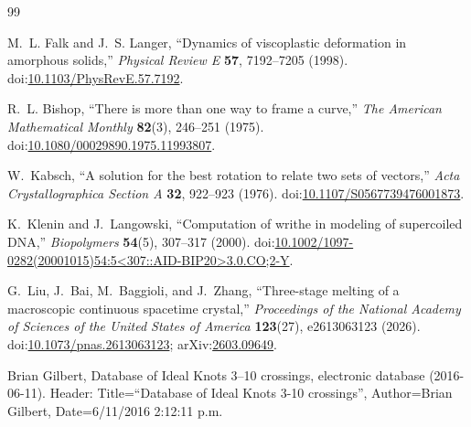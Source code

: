\begin{thebibliography}{99}

M.~L. Falk and J.~S. Langer,
``Dynamics of viscoplastic deformation in amorphous solids,''
\textit{Physical Review E} \textbf{57}, 7192--7205 (1998).
doi:\href{https://doi.org/10.1103/PhysRevE.57.7192}{10.1103/PhysRevE.57.7192}.

R.~L. Bishop,
``There is more than one way to frame a curve,''
\textit{The American Mathematical Monthly} \textbf{82}(3), 246--251 (1975).
doi:\href{https://doi.org/10.1080/00029890.1975.11993807}{10.1080/00029890.1975.11993807}.

W.~Kabsch,
``A solution for the best rotation to relate two sets of vectors,''
\textit{Acta Crystallographica Section A} \textbf{32}, 922--923 (1976).
doi:\href{https://doi.org/10.1107/S0567739476001873}{10.1107/S0567739476001873}.

K.~Klenin and J.~Langowski,
``Computation of writhe in modeling of supercoiled DNA,''
\textit{Biopolymers} \textbf{54}(5), 307--317 (2000).
doi:\href{https://doi.org/10.1002/1097-0282(20001015)54:5<307::AID-BIP20>3.0.CO;2-Y}{10.1002/1097-0282(20001015)54:5<307::AID-BIP20>3.0.CO;2-Y}.

G.~Liu, J.~Bai, M.~Baggioli, and J.~Zhang,
``Three-stage melting of a macroscopic continuous spacetime crystal,''
\textit{Proceedings of the National Academy of Sciences of the United States of America}
\textbf{123}(27), e2613063123 (2026).
doi:\href{https://doi.org/10.1073/pnas.2613063123}{10.1073/pnas.2613063123};
arXiv:\href{https://arxiv.org/abs/2603.09649}{2603.09649}.

Brian Gilbert,
\newblock Database of Ideal Knots 3--10 crossings,
\newblock electronic database (2016-06-11).
\newblock Header: Title=``Database of Ideal Knots 3-10 crossings'',
Author=Brian Gilbert, Date=6/11/2016 2:12:11 p.m.

\end{thebibliography}
